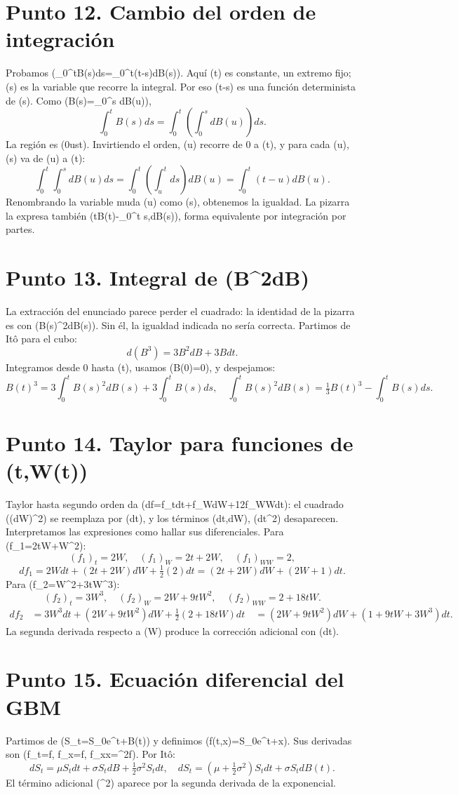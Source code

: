 \documentclass[11pt,a4paper]{article}
\begin{document}
\section*{Punto 12. Cambio del orden de integración}
Probamos (\int_0^tB(s)ds=\int_0^t(t-s)dB(s)). Aquí (t) es constante, un extremo fijo; (s) es la variable que recorre la integral. Por eso (t-s) es una función determinista de (s).
Como (B(s)=\int_0^s dB(u)),
\[
\int_0^tB(s)ds=\int_0^t\left(\int_0^s dB(u)\right)ds.
\]
La región es (0\le u\le s\le t). Invirtiendo el orden, (u) recorre de 0 a (t), y para cada (u), (s) va de (u) a (t):
\[
\int_0^t\int_0^s dB(u)ds=\int_0^t\left(\int_u^t ds\right)dB(u)=\int_0^t(t-u)dB(u).
\]
Renombrando la variable muda (u) como (s), obtenemos la igualdad. La pizarra la expresa también (tB(t)-\int_0^t s,dB(s)), forma equivalente por integración por partes.

\section*{Punto 13. Integral de (B^2dB)}
La extracción del enunciado parece perder el cuadrado: la identidad de la pizarra es con (B(s)^2dB(s)). Sin él, la igualdad indicada no sería correcta. Partimos de Itô para el cubo:
\[
d(B^3)=3B^2dB+3Bdt.
\]
Integramos desde 0 hasta (t), usamos (B(0)=0), y despejamos:
\[
B(t)^3=3\int_0^tB(s)^2dB(s)+3\int_0^tB(s)ds,
\quad\boxed{\int_0^tB(s)^2dB(s)=\tfrac13B(t)^3-\int_0^tB(s)ds}.
\]

\section*{Punto 14. Taylor para funciones de (t,W(t))}
Taylor hasta segundo orden da (df=f_tdt+f_WdW+\tfrac12f_{WW}dt): el cuadrado ((dW)^2) se reemplaza por (dt), y los términos (dt,dW), (dt^2) desaparecen. Interpretamos las expresiones como hallar sus diferenciales.
Para (f_1=2tW+W^2):
\[
(f_1)_t=2W,\quad(f_1)_W=2t+2W,\quad(f_1)_{WW}=2,
\]
\[
df_1=2Wdt+(2t+2W)dW+\tfrac12(2)dt
=\boxed{(2t+2W)dW+(2W+1)dt}.
\]
Para (f_2=W^2+3tW^3):
\[
(f_2)_t=3W^3,\quad(f_2)_W=2W+9tW^2,\quad(f_2)_{WW}=2+18tW.
\]
\[
\begin{aligned}
df_2&=3W^3dt+(2W+9tW^2)dW+\tfrac12(2+18tW)dt\
&=\boxed{(2W+9tW^2)dW+(1+9tW+3W^3)dt}.
\end{aligned}
\]
La segunda derivada respecto a (W) produce la corrección adicional con (dt).

\section*{Punto 15. Ecuación diferencial del GBM}
Partimos de (S_t=S_0e^{\mu t+\sigma B(t)}) y definimos (f(t,x)=S_0e^{\mu t+\sigma x}). Sus derivadas son (f_t=\mu f, f_x=\sigma f, f_{xx}=\sigma^2f). Por Itô:
\[
dS_t=\mu S_tdt+\sigma S_tdB+\tfrac12\sigma^2S_tdt,
\quad\boxed{dS_t=(\mu+\tfrac12\sigma^2)S_tdt+\sigma S_tdB(t)}.
\]
El término adicional (\sigma^2) aparece por la segunda derivada de la exponencial.
\end{document}

